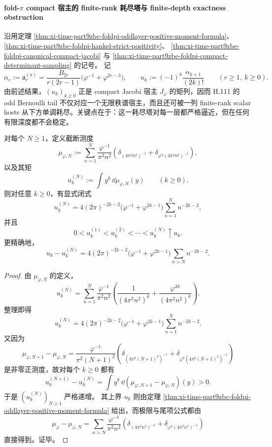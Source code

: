 \paragraph{fold-\texorpdfstring{$\pi$}{pi} compact 宿主的 finite-rank 耗尽塔与 finite-depth exactness obstruction}
沿用定理 \ref{thm:xi-time-part9zbc-foldpi-oddlayer-positive-moment-formula}、
\ref{thm:xi-time-part9zbc-foldpi-hankel-strict-positivity}、
\ref{thm:xi-time-part9zbe-foldpi-canonical-compact-jacobi}
与 \ref{thm:xi-time-part9zbe-foldpi-compact-determinant-sampling} 的记号。
记
\[
\alpha_r:=\mathfrak a_r^{(\pi)}
=
\frac{B_{2r}}{r(2r-1)}
\bigl(\varphi^{-1}+\varphi^{2r-3}\bigr),
\qquad
u_k:=(-1)^k\frac{\alpha_{k+1}}{(2k)!}
\qquad (r\ge 1,\ k\ge 0).
\]
由前述结果，\((u_k)_{k\ge 0}\) 正是 compact Jacobi 宿主 \(J_\varphi\) 的矩列，因而 H.111 的 odd Bernoulli tail 不仅对应一个无限秩谱宿主，而且还可被一列 finite-rank scalar hosts 从下方单调耗尽。关键点在于：这一耗尽塔对每一层都严格逼近，但在任何有限深度都不会稳定。

\begin{theorem}\label{thm:xi-time-part9zbg-foldpi-finite-rank-moment-exhaustion}
对每个 \(N\ge 1\)，定义截断测度
\[
\mu_{\varphi,N}
:=
\sum_{n=1}^{N}\frac{\varphi^{-1}}{\pi^2n^2}
\left(
\delta_{(4\pi^2n^2)^{-1}}
+
\delta_{\varphi^2(4\pi^2n^2)^{-1}}
\right),
\]
以及其矩
\[
u_k^{(N)}:=\int y^k\,\dd\mu_{\varphi,N}(y)
\qquad (k\ge 0).
\]
则对任意 \(k\ge 0\)，有显式闭式
\[
u_k^{(N)}
=
4(2\pi)^{-2k-2}
\bigl(\varphi^{-1}+\varphi^{2k-1}\bigr)
\sum_{n=1}^{N}n^{-2k-2},
\]
并且
\[
0<u_k^{(1)}<u_k^{(2)}<\cdots<u_k^{(N)}\uparrow u_k.
\]
更精确地，
\[
u_k-u_k^{(N)}
=
4(2\pi)^{-2k-2}
\bigl(\varphi^{-1}+\varphi^{2k-1}\bigr)
\sum_{n>N}n^{-2k-2}.
\]
\end{theorem}
\begin{proof}
由 \(\mu_{\varphi,N}\) 的定义，
\[
u_k^{(N)}
=
\sum_{n=1}^{N}\frac{\varphi^{-1}}{\pi^2n^2}
\left(
\frac{1}{(4\pi^2n^2)^k}
+
\frac{\varphi^{2k}}{(4\pi^2n^2)^k}
\right).
\]
整理即得
\[
u_k^{(N)}
=
4(2\pi)^{-2k-2}
\bigl(\varphi^{-1}+\varphi^{2k-1}\bigr)
\sum_{n=1}^{N}n^{-2k-2}.
\]
又因为
\[
\mu_{\varphi,N+1}-\mu_{\varphi,N}
=
\frac{\varphi^{-1}}{\pi^2(N+1)^2}
\left(
\delta_{(4\pi^2(N+1)^2)^{-1}}
+
\delta_{\varphi^2(4\pi^2(N+1)^2)^{-1}}
\right)
\]
是非零正测度，故对每个 \(k\ge 0\) 都有
\[
u_k^{(N+1)}-u_k^{(N)}
=
\int y^k\,\dd(\mu_{\varphi,N+1}-\mu_{\varphi,N})(y)>0.
\]
于是 \((u_k^{(N)})_{N\ge 1}\) 严格递增。
其上界 \(u_k\) 则由定理 \ref{thm:xi-time-part9zbc-foldpi-oddlayer-positive-moment-formula} 给出，而极限与尾项公式都由
\[
\mu_\varphi-\mu_{\varphi,N}
=
\sum_{n>N}\frac{\varphi^{-1}}{\pi^2n^2}
\left(
\delta_{(4\pi^2n^2)^{-1}}
+
\delta_{\varphi^2(4\pi^2n^2)^{-1}}
\right)
\]
直接得到。证毕。
\end{proof}

